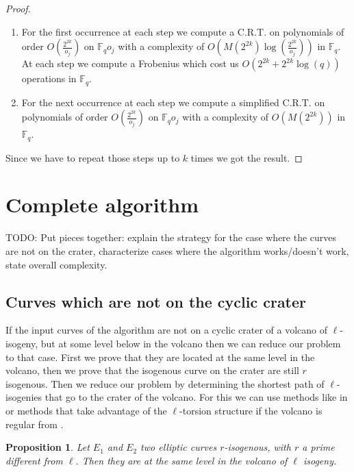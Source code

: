 \documentclass{lms}
\newcommand{\todo}[1]{{\color{red}TODO: #1}}
\newtheorem{prop}[thm]{Proposition}
\begin{document}
\begin{proof}
\begin{enumerate}
\item  For the first occurrence at each step we compute a C.R.T. on polynomials of order $O(\frac{2^{2k}}{o_j})$ on $\mathbb{F}_q{o_j}$ with a complexity of $O(M(2^{2k})\log(\frac{2^{2k}}{o_j}))$ in $\mathbb{F}_q$. At each step we compute a Frobenius which cost us $O(2^{2k}+2^{2k}\log(q))$ operations in $\mathbb{F}_q$.
\item For the next occurrence at each step we compute a simplified C.R.T. on polynomials of order $O(\frac{2^{2k}}{o_j})$ on $\mathbb{F}_q{o_j}$ with a complexity of $O(M(2^{2k}))$ in $\mathbb{F}_q$.
\end{enumerate}
Since we have to repeat those steps up to $k$ times we got the result.
\end{proof}


\section{Complete algorithm}
\label{sec:complete-algorithm}
\todo{Put pieces together: explain the strategy for the case where the
  curves are not on the crater, characterize cases where the algorithm
  works/doesn't work, state overall complexity.}
  
  \subsection{Curves which are not on the cyclic crater}

If the input curves of the algorithm are not on a cyclic crater of a volcano of $\ell$-isogeny, but at some level below in the volcano then we can reduce our problem to that case. First we prove that they are located at the same level in the volcano, then we prove that the isogenous curve on the crater are still $r$ isogenous. Then we reduce our problem by determining the shortest path of $\ell$-isogenies that go to the crater of the volcano. For this we can use methods like in \cite{DBLP:journals/amc/MiretMSTV06} or methods that take advantage of the $\ell$-torsion structure if the volcano is regular from \cite{DBLP:journals/moc/MiretMRV05}.
  
\begin{prop}
Let $E_1$ and $E_2$ two elliptic curves $r$-isogenous, with $r$ a prime different from $\ell$. Then they are at the same level in the volcano of $\ell$ isogeny.
\end{prop}
\end{document}

